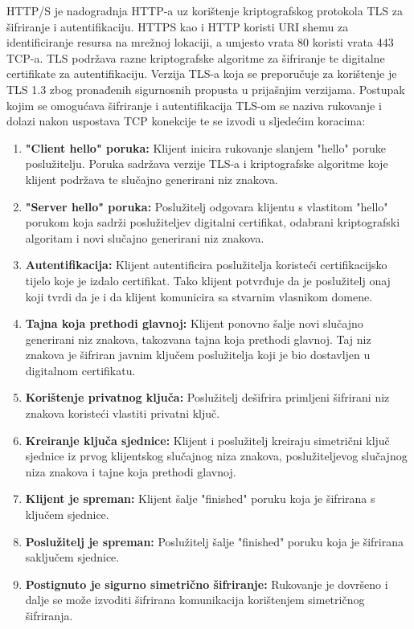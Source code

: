 \documentclass[times, utf8, diplomski]{fer}
\begin{document}
HTTP/S  je nadogradnja HTTP-a uz korištenje kriptografskog protokola TLS  za šifriranje i autentifikaciju. HTTPS kao i HTTP koristi URI shemu za identificiranje resursa na mrežnoj lokaciji, a umjesto vrata 80 koristi vrata 443 TCP-a. TLS podržava razne kriptografske algoritme za šifriranje te digitalne certifikate za autentifikaciju. Verzija TLS-a koja se preporučuje za korištenje je TLS 1.3 zbog pronađenih sigurnosnih propusta u prijašnjim verzijama. Postupak kojim se omogućava šifriranje i autentifikacija TLS-om se naziva rukovanje i dolazi nakon uspostava TCP konekcije te se izvodi u sljedećim koracima\cite{TLS}:
\begin{enumerate}
    \item\textbf{"Client hello" poruka:} Klijent inicira rukovanje slanjem "hello" poruke poslužitelju. Poruka sadržava verzije TLS-a i kriptografske algoritme koje klijent podržava te slučajno generirani niz znakova.
    \item\textbf{"Server hello" poruka:} Poslužitelj odgovara klijentu s vlastitom "hello" porukom koja sadrži poslužiteljev digitalni certifikat, odabrani kriptografski algoritam i novi slučajno generirani niz znakova.
    \item\textbf{Autentifikacija:} Klijent autentificira poslužitelja koristeći certifikacijsko tijelo koje je izdalo certifikat. Tako klijent potvrđuje da je poslužitelj onaj koji tvrdi da je i da klijent komunicira sa stvarnim vlasnikom domene.
    \item\textbf{Tajna koja prethodi glavnoj:} Klijent ponovno šalje novi slučajno generirani niz znakova, takozvana tajna koja prethodi glavnoj. Taj niz znakova je šifriran javnim ključem poslužitelja koji je bio dostavljen u digitalnom certifikatu.
    \item\textbf{Korištenje privatnog ključa:} Poslužitelj dešifrira primljeni šifrirani niz znakova koristeći vlastiti privatni ključ.
    \item\textbf{Kreiranje ključa sjednice:} Klijent i poslužitelj kreiraju simetrični ključ sjednice iz prvog klijentskog slučajnog niza znakova, poslužiteljevog slučajnog niza znakova i tajne koja prethodi glavnoj.
    \item\textbf{Klijent je spreman:} Klijent šalje "finished" poruku koja je šifrirana s ključem sjednice.
    \item\textbf{Poslužitelj je spreman:} Poslužitelj šalje "finished" poruku koja je šifrirana saključem sjednice.
    \item\textbf{Postignuto je sigurno simetrično šifriranje:} Rukovanje je dovršeno i dalje se može izvoditi šifrirana komunikacija korištenjem simetričnog šifriranja.
\end{enumerate}
\end{document}
